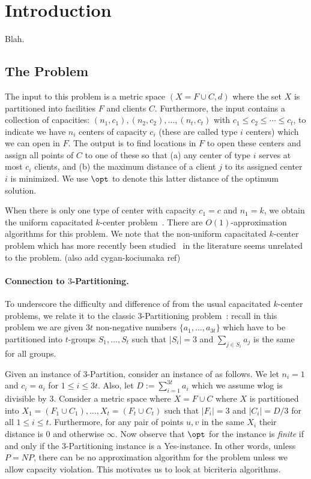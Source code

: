 \section{Introduction}
Blah.
\subsection{The \mckc Problem}
The input to this problem is a metric space $(X = F\cup C,d)$ where the set $X$ is partitioned into facilities $F$ and clients $C$.
Furthermore, the input contains  a collection of capacities: $(n_1,c_1), (n_2,c_2),\ldots, (n_t,c_t)$
 with $c_1 \leq c_2 \le \cdots \le c_t$,  to indicate we have $n_i$ centers of capacity $c_i$ (these are called type $i$ centers) which we can open in $F$. 
The output is to find locations in $F$ to open these centers and assign all points of $C$ to one of these so that (a) any center of type $i$ serves at most $c_i$ clients, and (b) the maximum distance of a client $j$ to its assigned center $i$ is minimized. We use $\opt$ to denote this latter distance of the optimum solution. \smallskip
 
 When there is only one type of center with capacity $c_1 = c$ and $n_1 = k$, we obtain the uniform capacitated $k$-center problem~\cite{barilan,khuller-sussman}. There are $O(1)$-approximation algorithms for this problem. We note that the non-uniform capacitated $k$-center problem which has more recently  been studied~\cite{cygan,ola,auonon} in the literature seems unrelated to the \mckc problem. (also add cygan-kociumaka ref)\smallskip

\paragraph{Connection to $3$-Partitioning.}
To underscore the difficulty and difference of \mckc from  the usual capacitated $k$-center problems, we relate it to the classic $3$-Partitioning problem~\cite{Garey-Johnson}: recall in this problem
we are given $3t$ non-negative numbers $\{a_1,\ldots,a_{3t}\}$ which have to be partitioned into $t$-groups $S_1,\ldots, S_t$ such that $|S_i| =  3$ and $\sum_{j\in S_i} a_j$ is the same for all groups.

Given an instance of $3$-Partition, consider an instance of \mckc as follows. We let $n_i = 1$ and $c_i = a_i$ for $1\leq i\leq 3t$. Also, let $D:= \sum_{i=1}^{3t} a_i$ which we assume wlog is divisible by $3$.
Consider a metric space where $X = F\cup C$ where $X$ is partitioned into $X_1 = (F_1\cup C_1),\ldots,X_t = (F_t\cup C_t)$ such that $|F_i| = 3$ and $|C_i| = D/3$ for all $1\le i\le t$.
Furthermore, for any pair of points $u,v$ in the same $X_i$ their distance is $0$ and otherwise $\infty$. 
Now observe that $\opt$ for the \mckc instance is {\em finite} if and only if the $3$-Partitioning instance is a Yes-instance. In other words, unless $P=NP$, there can be no approximation algorithm for the problem
unless we allow capacity violation. This motivates us to look at bicriteria algorithms.

